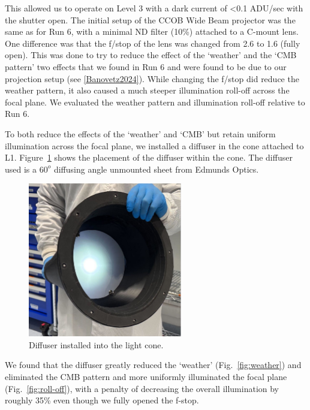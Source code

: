 This allowed us to operate on Level 3 with a dark current of
\textless0.1 ADU/sec with the shutter open. The initial setup of the
CCOB Wide Beam projector was the same as for Run 6, with a minimal ND filter (10\%)
attached to a C-mount lens. One difference was that the f/stop of the lens
was changed from 2.6 to 1.6 (fully open). This was done to try to
reduce the effect of the `weather' and
the `CMB pattern' two effects that we
found in Run 6 and were found to be due to our projection setup (see
\hyperref[Banovetz2024]{{[}Banovetz2024{]}}). While changing  the f/stop  did
reduce the weather pattern, it also caused a much steeper illumination roll-off
across the focal plane. We evaluated the weather pattern and illumination roll-off relative to Run 6.


To both reduce the effects of the
`weather' and
`CMB' but retain uniform illumination
across the focal plane, we installed a diffuser in the cone attached to
L1. Figure~\ref{fig:diffuser} shows the placement of the diffuser within the cone.  The diffuser used is a $60^o$ diffusing angle unmounted sheet from Edmunds Optics.

\begin{figure}
\centering
\includegraphics[width=0.6\textwidth]{figures/Diffuser.jpg}
\caption{Diffuser installed into the light cone.}
\label{fig:diffuser}
\end{figure}

We found that the diffuser greatly reduced the `weather' (Fig.~\ref{fig:weather}) and eliminated the CMB pattern and more uniformly illuminated the focal plane (Fig.~\ref{fig:roll-off}), with a penalty of decreasing the overall illumination by roughly 35\% even though we fully opened the f-stop.


